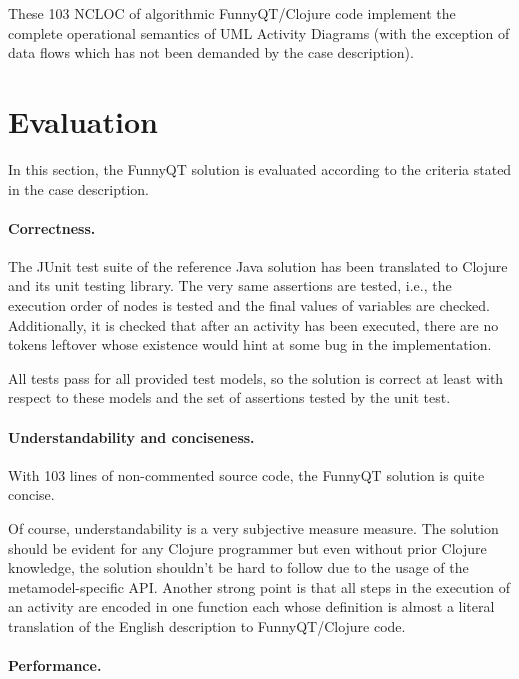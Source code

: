 \documentclass[submission]{eptcs}
\begin{document}
These 103 NCLOC of algorithmic FunnyQT/Clojure code implement the complete
operational semantics of UML Activity Diagrams (with the exception of data
flows which has not been demanded by the case description).

\section{Evaluation}
\label{sec:evaluation}

In this section, the FunnyQT solution is evaluated according to the criteria
stated in the case description.

\paragraph{Correctness.}

The JUnit test suite of the reference Java solution has been translated to
Clojure and its unit testing library.  The very same assertions are tested,
i.e., the execution order of nodes is tested and the final values of variables
are checked.  Additionally, it is checked that after an activity has been
executed, there are no tokens leftover whose existence would hint at some bug
in the implementation.

All tests pass for all provided test models, so the solution is correct at
least with respect to these models and the set of assertions tested by the unit
test.


\paragraph{Understandability and conciseness.}

With 103 lines of non-commented source code, the FunnyQT solution is quite
concise.

Of course, understandability is a very subjective measure measure.  The
solution should be evident for any Clojure programmer but even without prior
Clojure knowledge, the solution shouldn't be hard to follow due to the usage of
the metamodel-specific API.  Another strong point is that all steps in the
execution of an activity are encoded in one function each whose definition is
almost a literal translation of the English description to FunnyQT/Clojure
code.


\paragraph{Performance.}
\end{document}
